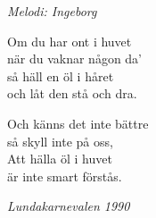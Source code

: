 {\footnotesize\textit{Melodi: Ingeborg}}\par
\vspace{10pt}
Om du har ont i huvet\\
när du vaknar någon da'\\
så häll en öl i håret\\
och låt den stå och dra.\par
\vspace{10pt}
Och känns det inte bättre\\
så skyll inte på oss,\\
Att hälla öl i huvet\\
är inte smart förstås.
\par
\vspace{10pt}
{\footnotesize\textit{Lundakarnevalen 1990}}
